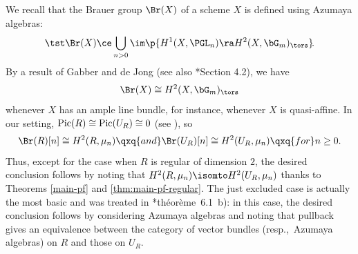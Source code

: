 \bpf
We recall that the Brauer group $\Br(X)$ of a scheme $X$ is defined using Azumaya algebras:
\[
\tst \Br(X) \ce \bigcup_{n > 0} \im\p{H^1(X, \PGL_n) \ra H^2(X, \bG_m)_\tors}\!.
\]
By a result of Gabber and de Jong \cite{dJ02} (see also \cite{CTS21}*{Section 4.2}), we have
\[
\Br(X) \cong H^2(X, \bG_m)_\tors
\]
whenever $X$ has an ample line bundle, for instance, whenever $X$ is quasi-affine. In our setting, %
$\operatorname{Pic}(R) \cong \operatorname{Pic}(U_R) \cong 0$ (see %
), so
\[
\Br(R)[n] \cong H^2(R, \mu_n) \qxq{and} \Br(U_R)[n] \cong H^2(U_R, \mu_n) \qxq{for} n \ge 0.
\]
Thus, except for the case when $R$ is regular of dimension $2$, the desired conclusion follows by noting that $H^2(R, \mu_n) \isomto H^2(U_R, \mu_n)$ thanks to Theorems \ref{main-pf} and \ref{thm:main-pf-regular}. The just excluded case is actually the most basic and was treated in \cite{Gro68c}*{th\'{e}or\`{e}me~6.1~b)}: in this case, the desired conclusion follows by considering Azumaya algebras and noting that pullback gives an equivalence between the category of vector bundles (resp.,~Azumaya algebras) on $R$ and those on $U_R$.
\epf




